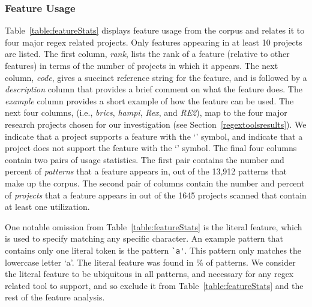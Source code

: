 \subsubsection{Feature Usage}
\label{sec:featureUsage}
Table~\ref{table:featureStats} displays feature usage from the corpus and relates it to four major regex related projects. Only features appearing in at least 10 projects are listed.
The first column, \emph{rank}, lists the rank of a feature (relative to other features) in terms of the number of projects in which it appears. The next column, \emph{code}, gives a succinct reference string for the feature, and is followed by a \emph{description} column that provides a brief comment on what the feature does.  The \emph{example} column provides a short example of how the feature can be used.
The next four columns, (i.e., \emph{brics}, \emph{hampi}, \emph{Rex}, and \emph{RE2}), map to the four major research projects chosen for our investigation (see Section~\ref{regextoolsresults}).  We indicate that a project supports a feature with the `\yes' symbol, and indicate that a project does not support the feature with the `\no' symbol.
The final four columns contain two pairs of usage statistics.  The first pair contains the number and percent of \emph{patterns} that a feature appears in, out of the 13,912 patterns that make up the corpus.  The second pair of columns contain the number and percent of \emph{projects} that a feature appears in out of the 1645 projects scanned that contain at least one utilization.

One notable omission from Table~\ref{table:featureStats} is the literal feature, which is used  to specify matching any specific character.  An example pattern that contains only one literal token is the pattern \verb!`a'!.  This pattern only matches the lowercase letter `a'.  The literal feature was found in \% of patterns.
We consider the literal feature to be ubiquitous in all patterns, and necessary for any regex related tool to support, and so exclude it from Table~\ref{table:featureStats} and the rest of the feature analysis.



